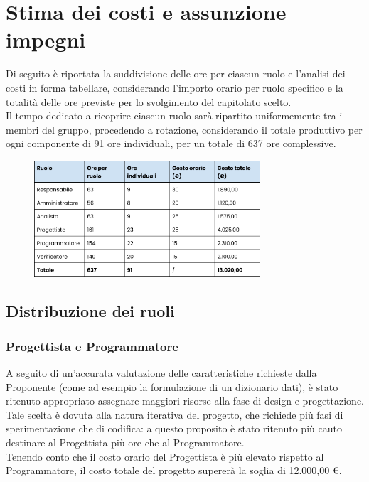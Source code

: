 





\makeFrontPage


\clearpage

\tableofcontents
\clearpage

\section{Stima dei costi e assunzione impegni} \label{assunzioneimpegni}
Di seguito è riportata la suddivisione delle ore per ciascun ruolo e l'analisi dei costi in forma tabellare, considerando l'importo orario per ruolo specifico e la totalità delle ore previste per lo svolgimento del capitolato scelto.\\
Il tempo dedicato a ricoprire ciascun ruolo sarà ripartito uniformemente tra i membri del gruppo, procedendo a rotazione, considerando il totale produttivo per ogni componente di 91 ore individuali, per un totale di 637 ore complessive.

\begin{figure}[H]
  \centering
  \includegraphics[width=0.75\textwidth]{assets/tabellacosti.png}
\end{figure}

\subsection{Distribuzione dei ruoli}

\subsubsection{Progettista e Programmatore}
A seguito di un'accurata valutazione delle caratteristiche richieste dalla Proponente (come ad esempio la formulazione di un dizionario dati), è stato ritenuto appropriato assegnare maggiori risorse alla fase di design e progettazione. Tale scelta è dovuta alla natura iterativa del progetto, che richiede più fasi di sperimentazione che di codifica: a questo proposito è stato ritenuto più cauto destinare al Progettista più ore che al Programmatore.\\
Tenendo conto che il costo orario del Progettista è più elevato rispetto al Programmatore, il costo totale del progetto supererà la soglia di 12.000,00 €.

